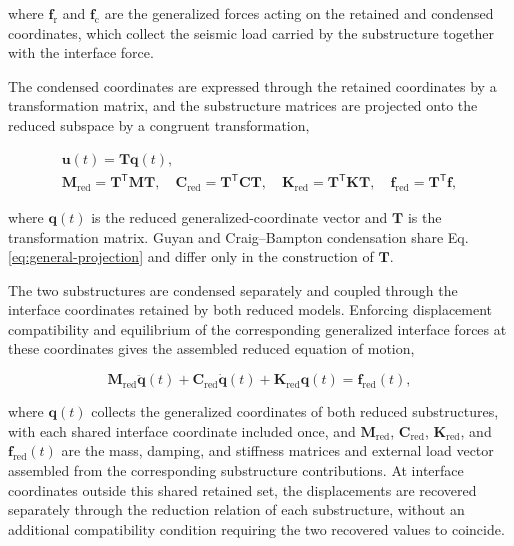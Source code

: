 \documentclass[a4paper,fleqn,review,12pt]{cas-sc}
\begin{document}
\noindent where \(\bm{f}_{\mathrm{r}}\) and \(\bm{f}_{\mathrm{c}}\) are the generalized forces acting on the retained and condensed coordinates, which collect the seismic load carried by the substructure together with the interface force.

The condensed coordinates are expressed through the retained coordinates by a transformation matrix, and the substructure matrices are projected onto the reduced subspace by a congruent transformation,

\vspace{-3.5em}
\begin{equation}
	\begin{gathered}
		\bm{u}(t)=\mathbf{T}\bm{q}(t),\\
		\mathbf{M}_{\mathrm{red}}=\mathbf{T}^{\mathsf{T}}\mathbf{M}\mathbf{T},\quad
		\mathbf{C}_{\mathrm{red}}=\mathbf{T}^{\mathsf{T}}\mathbf{C}\mathbf{T},\quad
		\mathbf{K}_{\mathrm{red}}=\mathbf{T}^{\mathsf{T}}\mathbf{K}\mathbf{T},\quad
		\bm{f}_{\mathrm{red}}=\mathbf{T}^{\mathsf{T}}\bm{f},
	\end{gathered}
	\label{eq:general-projection}
\end{equation}
\vspace{-3.0em}

\noindent where \(\bm{q}(t)\) is the reduced generalized-coordinate vector and \(\mathbf{T}\) is the transformation matrix. Guyan and Craig--Bampton condensation share Eq. \eqref{eq:general-projection} and differ only in the construction of \(\mathbf{T}\).

The two substructures are condensed separately and coupled through the interface coordinates retained by both reduced models. Enforcing displacement compatibility and equilibrium of the corresponding generalized interface forces at these coordinates gives the assembled reduced equation of motion,

\vspace{-3.5em}
\begin{equation}
	\mathbf{M}_{\mathrm{red}}\ddot{\bm{q}}(t)
	+\mathbf{C}_{\mathrm{red}}\dot{\bm{q}}(t)
	+\mathbf{K}_{\mathrm{red}}\bm{q}(t)
	=\bm{f}_{\mathrm{red}}(t),
	\label{eq:assembled-reduced}
\end{equation}
\vspace{-3.5em}

\noindent where \(\bm{q}(t)\) collects the generalized coordinates of both reduced substructures, with each shared interface coordinate included once, and \(\mathbf{M}_{\mathrm{red}}\), \(\mathbf{C}_{\mathrm{red}}\), \(\mathbf{K}_{\mathrm{red}}\), and \(\bm{f}_{\mathrm{red}}(t)\) are the mass, damping, and stiffness matrices and external load vector assembled from the corresponding substructure contributions. At interface coordinates outside this shared retained set, the displacements are recovered separately through the reduction relation of each substructure, without an additional compatibility condition requiring the two recovered values to coincide.
\end{document}
